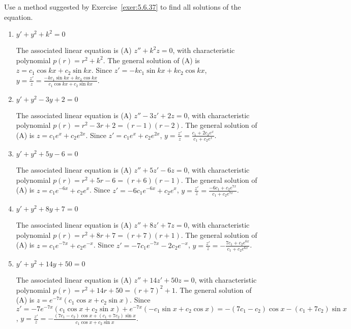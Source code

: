 \documentclass{ximera}
\begin{document}
\begin{problem}\label{exer:5.6.38}
Use a method suggested by Exercise~\ref{exer:5.6.37}  to find all
solutions of the equation.

\begin{enumerate}

\item $y'+y^2+k^2=0$

\begin{solution}
    The associated linear equation is (A) $z''+k^2z=0$, with
characteristic polynomial $p(r)=r^2+k^2$. The general solution of (A)
is $z=c_1\cos kx+c_2\sin kx$. Since $z'=-kc_1\sin kx+kc_2\cos kx$,
$y=\frac{z'}{ z}=\frac{-kc_1\sin kx+kc_2\cos kx}{ c_1 \cos
kx+c_2\sin kx}$.
\end{solution}

\item $y'+y^2-3y+2=0$

\begin{solution}
    The associated linear equation is (A) $z''-3z'+2z=0$, with
characteristic polynomial $p(r)=r^2-3r+2=(r-1)(r-2)$. The general
solution of (A) is $z=c_1e^x+c_2e^{2x}$. Since $z'=c_1e^x+c_2e^{2x}$,
$y=\frac{z'}{ z}=\frac{c_1+2c_2e^x}{ c_1+c_2e^x}$.
\end{solution}

\item $y'+y^2+5y-6=0$

\begin{solution}
    The associated linear equation is (A) $z''+5z'-6z=0$, with
characteristic polynomial $p(r)=r^2+5r-6=(r+6)(r-1)$. The general
solution of (A) is $z=c_1e^{-6x}+c_2e^x$. Since
$z'=-6c_1e^{-6x}+c_2e^x$, $y=\frac{z'}{ z}=\frac{-6c_1+c_2e^{7x}}{
c_1+c_2e^{7x}}$.
\end{solution}

\item $y'+y^2+8y+7=0$

\begin{solution}
    The associated linear equation is (A) $z''+8z'+7z=0$, with
characteristic polynomial $p(r)=r^2+8r+7=(r+7)(r+1)$. The general
solution of (A) is $z=c_1e^{-7x}+c_2e^{-x}$. Since
$z'=-7c_1e^{-7x}-2c_2e^{-x}$, $y=\frac{z'}{
z}=-\frac{7c_1+c_2e^{6x}}{ c_1+c_2e^{6x}}$.
\end{solution}

\item $y'+y^2+14y+50=0$

\begin{solution}
    The associated linear equation is (A) $z''+14z'+50z=0$, with
characteristic polynomial $p(r)=r^2+14r+50=(r+7)^2+1$. The general
solution of (A) is $z=e^{-7x}(c_1\cos x+c_2\sin x)$. Since
$z'=-7e^{-7x}(c_1\cos x+c_2\sin x)+ e^{-7x}(-c_1\sin x+c_2\cos
x)=-(7c_1-c_2)\cos x-(c_1+7c_2)\sin x$, $y=\frac{z'}{
z}=-\frac{(7c_1-c_2)\cos x+(c_1+7c_2)\sin x}{ c_1\cos x+c_2\sin x}$.
\end{solution}


\end{enumerate}
\end{problem}
\end{document}

